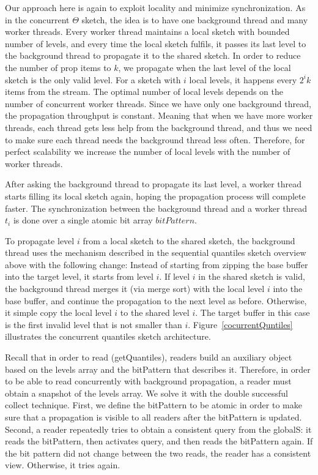 Our approach here is again to exploit locality and minimize
synchronization.
As in the concurrent $\Theta$ sketch, the idea is to have one
background thread and many worker threads.
Every worker thread maintains a local sketch with bounded number
of levels, and every time the local sketch fulfils, it passes
its last level to the background thread to propagate it to the
shared sketch.
In order to reduce the number of prop items to $k$, we
propagate when the last level of the local sketch is the only
valid level.
For a sketch with $i$ local levels, it happens every $2^ik$
items from the stream.
The optimal number of local levels depends on the number of
concurrent worker threads.
Since we have only one background thread, the propagation
throughput is constant.
Meaning that when we have more worker threads, each thread gets
less help from the background thread, and thus
we need to make sure each thread needs the background thread
less often.
Therefore, for perfect scalability we increase the number of
local levels with the number of worker threads.

After asking the background thread to propagate its last level,
a worker thread starts filling its local sketch again, hoping the
propagation process will complete faster.
The synchronization between the
background thread and a worker thread $t_i$ is done over a
single atomic bit array $bitPattern$.

To propagate level $i$ from a local sketch to the shared sketch,
the background thread uses the mechanism described in the
sequential quantiles sketch overview above with the following
change:
Instead of starting from zipping the base buffer
into the target level, it starts from level $i$.
If level $i$ in the shared sketch is valid, the background
thread merges it (via merge sort) with the local level $i$ into
the base buffer, and continue the propagation to the next level
as before.
Otherwise, it simple copy the local level $i$ to the shared level
$i$.
The target buffer in this case is the first invalid level that is
not smaller than $i$.
Figure~\ref{cocurrentQuntiles} illustrates the concurrent
quantiles sketch architecture.

Recall that in order to read (getQuantiles), readers build an
auxiliary object based on the levels array and the bitPattern
that describes it.
Therefore, in order to be able to read concurrently with
background propagation, a reader must obtain a snapshot of the
levels array.
We solve it with the double successful collect technique.
First, we define the bitPattern to be atomic in order to make sure
that a propagation is visible to all readers after the
bitPattern is updated.
Second, a reader repeatedly tries to obtain a consistent query from
the globalS: it reads the bitPattern, then activates query,
and then reads the bitPattern again.
If the bit pattern did not change between the two reads, the
reader has a consistent view.
Otherwise, it tries again.

